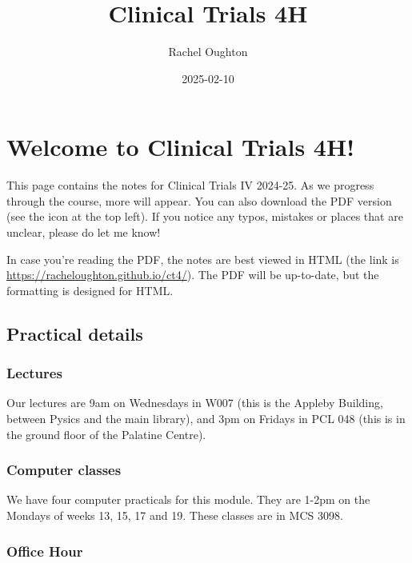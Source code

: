 \documentclass[
  openany]{book}
\title{Clinical Trials 4H}
\author{Rachel Oughton}
\date{2025-02-10}
\theoremstyle{definition}
\theoremstyle{definition}
\theoremstyle{definition}
\theoremstyle{definition}
\theoremstyle{remark}
\begin{document}
\maketitle

{
\setcounter{tocdepth}{1}
\tableofcontents
}
\chapter*{Welcome to Clinical Trials 4H!}\label{welcome-to-clinical-trials-4h}

This page contains the notes for Clinical Trials IV 2024-25. As we progress through the course, more will appear. You can also download the PDF version (see the icon at the top left). If you notice any typos, mistakes or places that are unclear, please do let me know!

In case you're reading the PDF, the notes are best viewed in HTML (the link is \url{https://racheloughton.github.io/ct4/}). The PDF will be up-to-date, but the formatting is designed for HTML.

\section*{Practical details}\label{practical-details}

\subsection*{Lectures}\label{lectures}

Our lectures are 9am on Wednesdays in W007 (this is the Appleby Building, between Pysics and the main library), and 3pm on Fridays in PCL 048 (this is in the ground floor of the Palatine Centre).

\subsection*{Computer classes}\label{computer-classes}

We have four computer practicals for this module. They are 1-2pm on the Mondays of weeks 13, 15, 17 and 19. These classes are in MCS 3098.

\subsection*{Office Hour}\label{office-hour}
\end{document}
